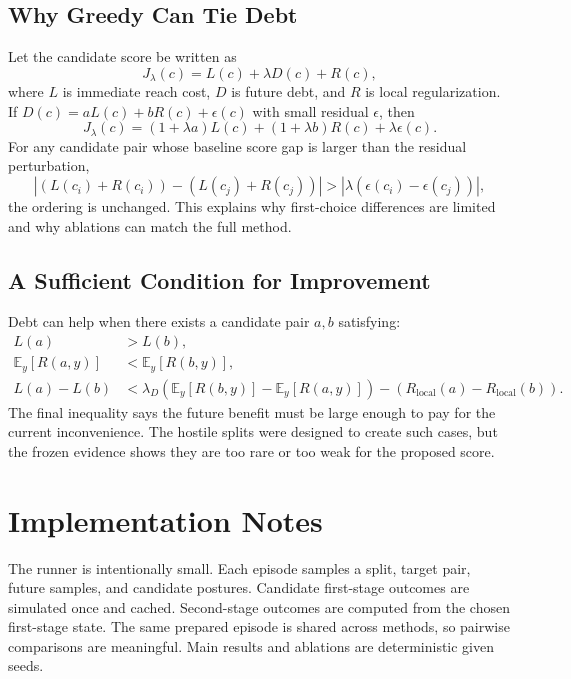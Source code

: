 \documentclass{article}
\begin{document}
\subsection{Why Greedy Can Tie Debt}

Let the candidate score be written as
\begin{equation}
  J_\lambda(c)=L(c)+\lambda D(c)+R(c),
\end{equation}
where $L$ is immediate reach cost, $D$ is future debt, and $R$ is local regularization. If $D(c)=aL(c)+bR(c)+\epsilon(c)$ with small residual $\epsilon$, then
\begin{equation}
  J_\lambda(c)=(1+\lambda a)L(c)+(1+\lambda b)R(c)+\lambda\epsilon(c).
\end{equation}
For any candidate pair whose baseline score gap is larger than the residual perturbation,
\begin{equation}
  |(L(c_i)+R(c_i))-(L(c_j)+R(c_j))| >
  |\lambda(\epsilon(c_i)-\epsilon(c_j))|,
\end{equation}
the ordering is unchanged. This explains why first-choice differences are limited and why ablations can match the full method.

\subsection{A Sufficient Condition for Improvement}

Debt can help when there exists a candidate pair $a,b$ satisfying:
\begin{align}
  L(a) &> L(b),\\
  \mathbb{E}_{y}[R(a,y)] &< \mathbb{E}_{y}[R(b,y)],\\
  L(a)-L(b) &< \lambda_D(\mathbb{E}_{y}[R(b,y)]-\mathbb{E}_{y}[R(a,y)]) - (R_{\mathrm{local}}(a)-R_{\mathrm{local}}(b)).
\end{align}
The final inequality says the future benefit must be large enough to pay for the current inconvenience. The hostile splits were designed to create such cases, but the frozen evidence shows they are too rare or too weak for the proposed score.

\section{Implementation Notes}

The runner is intentionally small. Each episode samples a split, target pair, future samples, and candidate postures. Candidate first-stage outcomes are simulated once and cached. Second-stage outcomes are computed from the chosen first-stage state. The same prepared episode is shared across methods, so pairwise comparisons are meaningful. Main results and ablations are deterministic given seeds.
\end{document}
